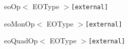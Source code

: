 \begin{CompactList}
\begin{CompactList}
\begin{CompactList}
\begin{CompactList}
\item {}
\end{CompactList}
\end{CompactList}
\end{CompactList}
\item eo\-Op$<$ EOType $>${\tt  \mbox{[}external\mbox{]}}\begin{CompactList}
\item eo\-Mon\-Op$<$ EOType $>${\tt  \mbox{[}external\mbox{]}}\item eo\-Quad\-Op$<$ EOType $>${\tt  \mbox{[}external\mbox{]}}\end{CompactList}
\item {}
\end{CompactList}
